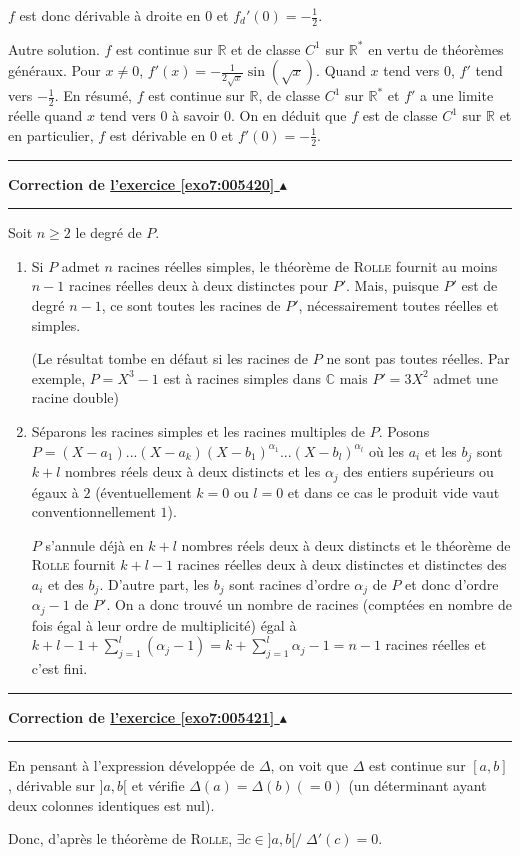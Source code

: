 \documentclass[11pt,a4paper]{article}
\newcommand{\Rr}{\mathbb{R}} \newcommand{\R}{\mathbb{R}}
\newcommand{\Cc}{\mathbb{C}} \newcommand{\C}{\mathbb{C}}
\newcounter{exo}
\newcommand{\correction}[1]{\hypertarget{cor7:#1}{}\label{cor7:#1}{\bf Correction de \hyperlink{exo7:#1}{l'exercice \ref{exo7:#1} $\blacktriangle$}}\vspace{1mm}\hrule\vspace{1mm}}
\newcommand{\fincorrection}{\vspace{1mm}\hrule\vspace*{7mm}}
\begin{document}
$f$ est donc dérivable à droite en $0$ et $f_d'(0)=-\frac{1}{2}$.

Autre solution. $f$ est continue sur $\Rr$ et de classe $C^1$ sur $\Rr^*$ en vertu de théorèmes généraux. Pour $x\neq0$, $f'(x)=-\frac{1}{2\sqrt{x}}\sin(\sqrt{x})$. Quand $x$ tend vers $0$, $f'$ tend vers $-\frac{1}{2}$. En résumé, $f$ est continue sur $\Rr$, de classe $C^1$ sur $\Rr^*$ et $f'$ a une limite réelle quand $x$ tend vers $0$ à savoir $0$. On en déduit que $f$ est de classe $C^1$ sur $\Rr$ et en particulier, $f$ est dérivable en $0$ et $f'(0)=-\frac{1}{2}$.

\fincorrection
\correction{005420}
Soit $n\geq2$ le degré de $P$.
\begin{enumerate}
\item  Si $P$ admet $n$ racines réelles simples, le théorème de \textsc{Rolle} fournit au moins $n-1$ racines réelles deux à deux distinctes pour $P'$. Mais, puisque $P'$ est de degré $n-1$, ce sont toutes les racines de $P'$, nécessairement toutes réelles et simples.

(Le résultat tombe en défaut si les racines de $P$ ne sont pas toutes réelles. Par exemple, $P=X^3-1$ est à racines simples dans $\Cc$ mais $P'=3X^2$ admet une racine double)

\item  Séparons les racines simples et les racines multiples de $P$. Posons $P=(X-a_1)...(X-a_k)(X-b_1)^{\alpha_1}...(X-b_l)^{\alpha_l}$ où les $a_i$ et les $b_j$ sont $k+l$ nombres réels deux à deux distincts et les $\alpha_j$ des entiers supérieurs ou égaux à $2$ (éventuellement $k=0$ ou $l=0$ et dans ce cas le produit vide vaut conventionnellement $1$).

$P$ s'annule déjà en $k+l$ nombres réels deux à deux distincts et le théorème de \textsc{Rolle} fournit $k+l-1$ racines réelles deux à deux distinctes et distinctes des $a_i$ et des $b_j$. D'autre part, les $b_j$ sont racines d'ordre $\alpha_j$ de $P$ et donc d'ordre $\alpha_j-1$ de $P'$. On a donc trouvé un nombre de racines (comptées en nombre de fois égal à leur ordre de multiplicité) égal à $k+l-1+\sum_{j=1}^{l}(\alpha_j-1)=k+\sum_{j=1}^{l}\alpha_j-1=n-1$ racines réelles et c'est fini.
\end{enumerate}
\fincorrection
\correction{005421}
En pensant à l'expression développée de $\Delta$, on voit que $\Delta$ est continue sur $[a,b]$, dérivable sur $]a,b[$ et vérifie $\Delta(a)=\Delta(b)(=0)$ (un déterminant ayant deux colonnes identiques est nul).

Donc, d'après le théorème de \textsc{Rolle}, $\exists c\in]a,b[/\;\Delta'(c)=0$.
\end{document}
